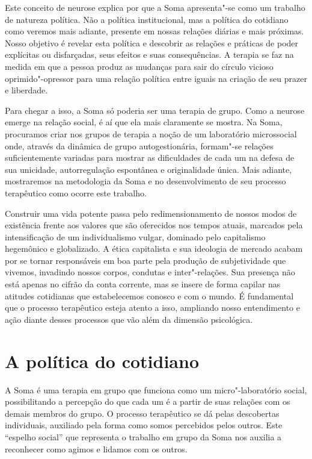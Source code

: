 Este conceito de neurose explica por que a Soma apresenta"-se como um
trabalho de natureza política. Não a política institucional, mas a
política do cotidiano como veremos mais adiante, presente em nossas
relações diárias e mais próximas. Nosso objetivo é revelar esta política
e descobrir as relações e práticas de poder explícitas ou disfarçadas,
seus efeitos e suas consequências. A terapia se faz na medida em que a
pessoa produz as mudanças para sair do círculo vicioso oprimido"-opressor
para uma relação política entre iguais na criação de seu prazer e
liberdade.

Para chegar a isso, a Soma só poderia ser uma terapia de grupo. Como a
neurose emerge na relação social, é aí que ela mais claramente se
mostra. Na Soma, procuramos criar nos grupos de terapia a noção de um
laboratório microssocial onde, através da dinâmica de grupo
autogestionária, formam"-se relações suficientemente variadas para
mostrar as dificuldades de cada um na defesa de sua unicidade,
autorregulação espontânea e originalidade única. Mais adiante,
mostraremos na metodologia da Soma e no desenvolvimento de seu processo
terapêutico como ocorre este trabalho.

Construir uma vida potente passa pelo redimensionamento de nossos modos
de existência frente aos valores que são oferecidos nos tempos atuais,
marcados pela intensificação de um individualismo vulgar, dominado pelo
capitalismo hegemônico e globalizado. A ética capitalista e sua
ideologia de mercado acabam por se tornar responsáveis em boa parte pela
produção de subjetividade que vivemos, invadindo nossos corpos, condutas
e inter"-relações. Sua presença não está apenas no cifrão da conta
corrente, mas se insere de forma capilar nas atitudes cotidianas que
estabelecemos conosco e com o mundo. É fundamental que o processo
terapêutico esteja atento a isso, ampliando nosso entendimento e ação
diante desses processos que vão além da dimensão psicológica.

\section{A política do cotidiano}

A Soma é uma terapia em grupo que funciona como um micro"-laboratório
social, possibilitando a percepção do que cada um é a partir de suas
relações com os demais membros do grupo. O processo terapêutico se dá
pelas descobertas individuais, auxiliado pela forma como somos
percebidos pelos outros. Este ``espelho social'' que representa o
trabalho em grupo da Soma nos auxilia a reconhecer como agimos e lidamos
com os outros.

